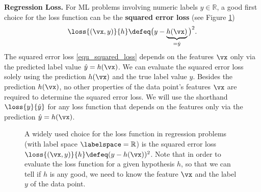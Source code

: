 \documentclass[12pt]{report}
\begin{document}
{\bf Regression Loss.} For ML problems involving numeric labels $y \in \mathbb{R}$, 
a good first choice for the loss function can be the {\bf squared error loss} (see Figure \ref{fig_squarederror_loss}) 
\begin{equation} 
\label{equ_squared_loss}
\loss{(\vx,y)}{h} \defeq \big(y - \underbrace{h(\vx)}_{=\hat{y}} \big)^{2}. 
\end{equation} 
The squared error loss \eqref{equ_squared_loss} depends on the 
features $\vx$ only via the predicted label value $\hat{y}= h(\vx)$. 
We can evaluate the squared error loss solely using the prediction $h(\vx)$ 
and the true label value $y$. Besides the prediction $h(\vx)$, no other 
properties of the data point's features $\vx$ are required to determine 
the squared error loss. We will use the shorthand $\loss{y}{\hat{y}}$ 
for any loss function that depends on the features only via the 
prediction $\hat{y}=h(\vx)$. 

\begin{figure}[htbp]
\begin{center}
     \vspace*{-4mm}
\end{center}
\caption{A widely used choice for the loss function in regression problems 
	(with label space $\labelspace=\mathbb{R}$) is the squared error loss $\loss{(\vx,y)}{h} \defeq (y - h(\vx))^{2}$. 
Note that in order to evaluate the loss function for a given hypothesis $h$, so that 
we can tell if $h$ is any good, we need to know the feature $\vx$ and the label $y$ of the data point.}
\label{fig_squarederror_loss}
\end{figure}
\end{document}
